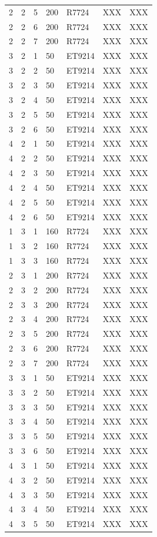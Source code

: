 \documentclass[review]{elsarticle}
\begin{document}
\begin{longtable}{  m{3em} | m{3em} | m{5em} | m{3em} | m{3em} | m{3em} | m{8em} }
2	&2	&5	&200	&R7724	&XXX	&XXX\\ 
2	&2	&6	&200	&R7724	&XXX	&XXX\\ 
2	&2	&7	&200	&R7724	&XXX	&XXX\\ 
3	&2	&1	&50	&ET9214	&XXX	&XXX\\ 
3	&2	&2	&50	&ET9214	&XXX	&XXX\\ 
3	&2	&3	&50	&ET9214	&XXX	&XXX\\ 
3	&2	&4	&50	&ET9214	&XXX	&XXX\\ 
3	&2	&5	&50	&ET9214	&XXX	&XXX\\ 
3	&2	&6	&50	&ET9214	&XXX	&XXX\\ 
4	&2	&1	&50	&ET9214	&XXX	&XXX\\ 
4	&2	&2	&50	&ET9214	&XXX	&XXX\\ 
4	&2	&3	&50	&ET9214	&XXX	&XXX\\ 
4	&2	&4	&50	&ET9214	&XXX	&XXX\\ 
4	&2	&5	&50	&ET9214	&XXX	&XXX\\ 
4	&2	&6	&50	&ET9214	&XXX	&XXX\\ 
1	&3	&1	&160	&R7724	&XXX	&XXX\\ 
1	&3	&2	&160	&R7724	&XXX	&XXX\\ 
1	&3	&3	&160	&R7724	&XXX	&XXX\\ 
2	&3	&1	&200	&R7724	&XXX	&XXX\\ 
2	&3	&2	&200	&R7724	&XXX	&XXX\\ 
2	&3	&3	&200	&R7724	&XXX	&XXX\\ 
2	&3	&4	&200	&R7724	&XXX	&XXX\\ 
2	&3	&5	&200	&R7724	&XXX	&XXX\\ 
2	&3	&6	&200	&R7724	&XXX	&XXX\\ 
2	&3	&7	&200	&R7724	&XXX	&XXX\\ 
3	&3	&1	&50	&ET9214	&XXX	&XXX\\ 
3	&3	&2	&50	&ET9214	&XXX	&XXX\\ 
3	&3	&3	&50	&ET9214	&XXX	&XXX\\ 
3	&3	&4	&50	&ET9214	&XXX	&XXX\\ 
3	&3	&5	&50	&ET9214	&XXX	&XXX\\ 
3	&3	&6	&50	&ET9214	&XXX	&XXX\\ 
4	&3	&1	&50	&ET9214	&XXX	&XXX\\ 
4	&3	&2	&50	&ET9214	&XXX	&XXX\\ 
4	&3	&3	&50	&ET9214	&XXX	&XXX\\ 
4	&3	&4	&50	&ET9214	&XXX	&XXX\\ 
4	&3	&5	&50	&ET9214	&XXX	&XXX\\ 

\end{longtable}
\end{document}
